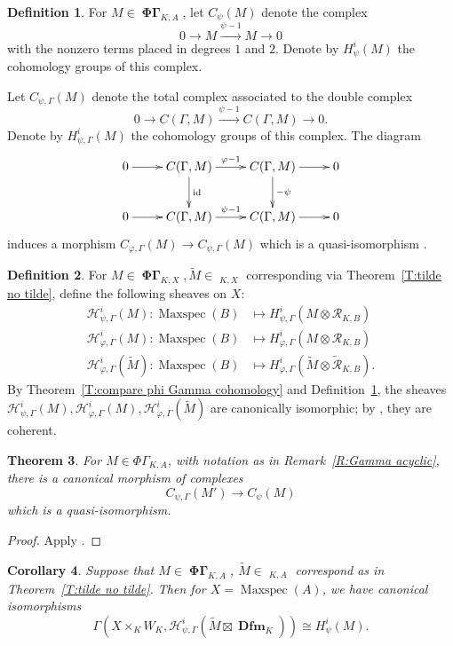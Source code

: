 \documentclass[12pt]{amsart}
\newtheorem{theorem}{Theorem}[section]
\newtheorem{cor}[theorem]{Corollary}
\theoremstyle{definition}
\newtheorem{defn}[theorem]{Definition}
\numberwithin{equation}{theorem}
\newcommand{\calH}{\mathcal{H}}
\newcommand{\calR}{\mathcal{R}}
\DeclareMathOperator{\Dfm}{\mathbf{Dfm}}
\DeclareMathOperator{\id}{id}
\DeclareMathOperator{\Maxspec}{Maxspec}
\DeclareMathOperator{\PhiGamma}{\mathbf{\Phi \Gamma}}
\DeclareMathOperator{\PhiGammatilde}{\widetilde{\mathbf{\Phi \Gamma}}}
\begin{document}
\begin{defn} \label{D:psi cohomology}
For $M \in \PhiGamma_{K,A}$, 
let $C_\psi(M)$ denote the complex
\[
0 \to M \stackrel{\psi-1}{\to} M \to 0
\]
with the nonzero terms placed in degrees $1$ and $2$.
Denote by $H^i_{\psi}(M)$ the cohomology groups of this complex.

Let $C_{\psi, \Gamma}(M)$ denote the total complex associated to the double complex
\[
0 \to C(\Gamma, M) \stackrel{\psi-1}{\to} C(\Gamma,M) \to 0.
\]
Denote by $H^i_{\psi, \Gamma}(M)$ the cohomology groups of this complex. The diagram
\[
\xymatrix{
0 \ar[r] & C(\Gamma, M) \ar^{\varphi-1}[r] \ar^{\id}[d] & C(\Gamma,M) \ar^{-\psi}[d]\ar[r] & 0 \\
0 \ar[r] & C(\Gamma, M) \ar^{\psi-1}[r] & C(\Gamma,M) \ar[r] & 0
}
\]
induces a morphism $C_{\varphi, \Gamma}(M) \to C_{\psi, \Gamma}(M)$
which is a quasi-isomorphism \cite[Proposition~2.3.6]{kpx}.
\end{defn}

\begin{defn}
For $M \in \PhiGamma_{K,X}, \tilde{M} \in \PhiGammatilde_{K,X}$ corresponding via
Theorem~\ref{T:tilde no tilde},
define the following sheaves on $X$:
\begin{align*}
\calH^i_{\psi, \Gamma}(M): \Maxspec(B) &\mapsto H^i_{\psi, \Gamma}(M \otimes \calR_{K,B}) \\
\calH^i_{\varphi, \Gamma}(M): \Maxspec(B) &\mapsto H^i_{\varphi, \Gamma}(M \otimes \calR_{K,B}) \\
\calH^i_{\varphi, \Gamma}(\tilde{M}): \Maxspec(B) &\mapsto H^i_{\varphi, \Gamma}(\tilde{M} \otimes \tilde{\calR}_{K,B}).
\end{align*}
By Theorem~\ref{T:compare phi Gamma cohomology} and
Definition~\ref{D:psi cohomology}, the sheaves $\calH^i_{\psi, \Gamma}(M),
\calH^i_{\varphi,\Gamma}(M), \calH^i_{\varphi,\Gamma}(\tilde{M})$
are canonically isomorphic; by 
\cite[Theorem~4.4.3, Remark~4.4.4]{kpx}, they are coherent.
\end{defn}

\begin{theorem} \label{T:psi to deformation}
For $M \in \Phi\Gamma_{K,A}$, with notation as in Remark~\ref{R:Gamma acyclic},
there is a canonical morphism of complexes
\[
C_{\psi, \Gamma}(M') \to C_{\psi}(M)
\]
which is a quasi-isomorphism.
\end{theorem}
\begin{proof}
Apply \cite[Theorem~4.4.8]{kpx}.
\end{proof}
\begin{cor} \label{C:psi to deformation}
Suppose that $M \in \PhiGamma_{K,A}$, $\tilde{M} \in \PhiGammatilde_{K,A}$ correspond as in 
Theorem~\ref{T:tilde no tilde}. Then for $X = \Maxspec(A)$,
we have canonical isomorphisms
\[
\Gamma(X \times_K W_K, \calH^i_{\psi, \Gamma}(\tilde{M} \boxtimes \Dfm_K)) \cong H^i_\psi(M).
\]
\end{cor}
\end{document}

